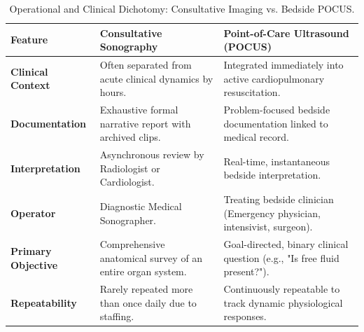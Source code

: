 \documentclass[11pt,a4paper]{article}
\begin{document}
\begin{table}[htbp]
\centering
\small
\setlength{\tabcolsep}{3pt}
\caption{Operational and Clinical Dichotomy: Consultative Imaging vs. Bedside POCUS.}
\label{tab:consult_vs_pocus}
\begin{tabular}{p{2.8cm} p{6.0cm} p{6.0cm}}
\toprule
\textbf{Feature} & \textbf{Consultative Sonography} & \textbf{Point-of-Care Ultrasound (POCUS)} \\
\midrule
\textbf{Clinical Context} & Often separated from acute clinical dynamics by hours. & Integrated immediately into active cardiopulmonary resuscitation. \\
\addlinespace
\textbf{Documentation} & Exhaustive formal narrative report with archived clips. & Problem-focused bedside documentation linked to medical record. \\
\addlinespace
\textbf{Interpretation} & Asynchronous review by Radiologist or Cardiologist. & Real-time, instantaneous bedside interpretation. \\
\addlinespace
\textbf{Operator} & Diagnostic Medical Sonographer. & Treating bedside clinician (Emergency physician, intensivist, surgeon). \\
\addlinespace
\textbf{Primary Objective} & Comprehensive anatomical survey of an entire organ system. & Goal-directed, binary clinical question (e.g., "Is free fluid present?"). \\
\addlinespace
\textbf{Repeatability} & Rarely repeated more than once daily due to staffing. & Continuously repeatable to track dynamic physiological responses. \\
\bottomrule
\end{tabular}
\end{table}
\end{document}
